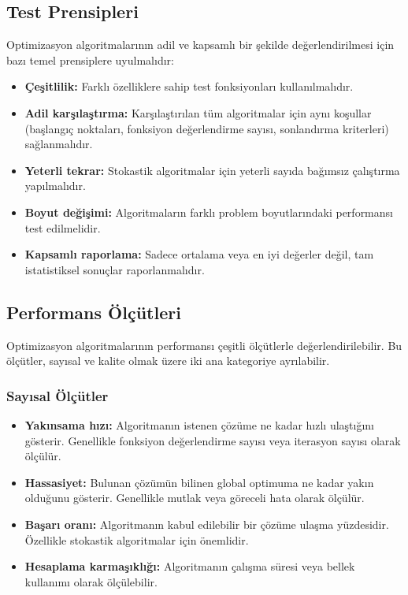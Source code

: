 \subsection{Test Prensipleri}

Optimizasyon algoritmalarının adil ve kapsamlı bir şekilde değerlendirilmesi için bazı temel prensiplere uyulmalıdır:

\begin{itemize}
    \item \textbf{Çeşitlilik:} Farklı özelliklere sahip test fonksiyonları kullanılmalıdır.
    
    \item \textbf{Adil karşılaştırma:} Karşılaştırılan tüm algoritmalar için aynı koşullar (başlangıç noktaları, fonksiyon değerlendirme sayısı, sonlandırma kriterleri) sağlanmalıdır.
    
    \item \textbf{Yeterli tekrar:} Stokastik algoritmalar için yeterli sayıda bağımsız çalıştırma yapılmalıdır.
    
    \item \textbf{Boyut değişimi:} Algoritmaların farklı problem boyutlarındaki performansı test edilmelidir.
    
    \item \textbf{Kapsamlı raporlama:} Sadece ortalama veya en iyi değerler değil, tam istatistiksel sonuçlar raporlanmalıdır.
\end{itemize}

\subsection{Performans Ölçütleri}

Optimizasyon algoritmalarının performansı çeşitli ölçütlerle değerlendirilebilir. Bu ölçütler, sayısal ve kalite olmak üzere iki ana kategoriye ayrılabilir.

\subsubsection{Sayısal Ölçütler}

\begin{itemize}
    \item \textbf{Yakınsama hızı:} Algoritmanın istenen çözüme ne kadar hızlı ulaştığını gösterir. Genellikle fonksiyon değerlendirme sayısı veya iterasyon sayısı olarak ölçülür.
    
    \item \textbf{Hassasiyet:} Bulunan çözümün bilinen global optimuma ne kadar yakın olduğunu gösterir. Genellikle mutlak veya göreceli hata olarak ölçülür.
    
    \item \textbf{Başarı oranı:} Algoritmanın kabul edilebilir bir çözüme ulaşma yüzdesidir. Özellikle stokastik algoritmalar için önemlidir.
    
    \item \textbf{Hesaplama karmaşıklığı:} Algoritmanın çalışma süresi veya bellek kullanımı olarak ölçülebilir.
\end{itemize}

